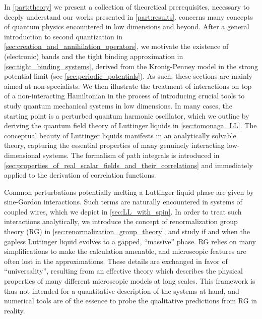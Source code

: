 In \cref{part:theory} we present a collection of theoretical prerequisites, necessary to deeply understand our works presented in \cref{part:results}.
 concerns many concepts of quantum physics encountered in low dimensions and beyond.
After a general introduction to second quantization in \cref{sec:creation_and_annihilation_operators}, we motivate the existence of (electronic) bands and the tight binding approximation in \cref{sec:tight_binding_systems}, derived from the Kronig-Penney model in the strong potential limit (see \cref{sec:periodic_potentials}).
As such, these sections are mainly aimed at non-specialists.
We then illustrate the treatment of interactions on top of a non-interacting Hamiltonian in the process of introducing crucial tools to study quantum mechanical systems in low dimensions.
In many cases, the starting point is a perturbed quantum harmonic oscillator, which we outline by deriving the quantum field theory of Luttinger liquids in \cref{sec:tomonaga_LL}.
The conceptual beauty of Luttinger liquids manifests in an analytically solvable theory, capturing the essential properties of many genuinely interacting low-dimensional systems.
The formalism of path integrals is introduced in \cref{sec:properties_of_real_scalar_fields_and_their_correlations} and immediately applied to the derivation of correlation functions.

Common perturbations potentially melting a Luttinger liquid phase are given by sine-Gordon interactions.
Such terms are naturally encountered in systems of coupled wires, which we depict in \cref{sec:LL_with_spin}.
In order to treat such interactions analytically, we introduce the concept of renormalization group theory (RG) in \cref{sec:renormalization_group_theory}, and study if and when the gapless Luttinger liquid evolves to a gapped, ``massive'' phase.
RG relies on many simplifications to make the calculation amenable, and microscopic features are often lost in the approximations.
These details are exchanged in favor of ``universality'', resulting from an effective theory which describes the physical properties of many different microscopic models at long scales.
This framework is thus not intended for a quantitative description of the systems at hand, and numerical tools are of the essence to probe the qualitative predictions from RG in reality.

